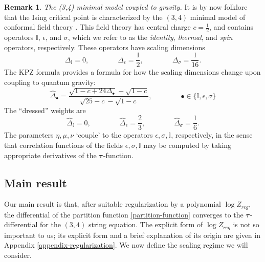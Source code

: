 \documentclass[usenames,dvipsnames]{article}
\theoremstyle{definition}
\newtheorem{remark}{Remark}[section]
\numberwithin{equation}{section}
\numberwithin{figure}{section}
\begin{document}
\begin{remark} \textit{The (3,4) minimal model coupled to gravity.}
It is by now folklore that the Ising critical point is characterized by the $(3,4)$ minimal model of conformal field theory \cite{DFMS}. This field theory has central charge $c=\frac{1}{2}$, and contains operators $\mathbb{I}$, $\epsilon$, and $\sigma$,
which we refer to as the \textit{identity}, \textit{thermal}, and \textit{spin} operators, respectively. These operators have scaling dimensions
    \begin{equation}
        \Delta_{\mathbb{I}} = 0, \qquad\qquad \Delta_{\epsilon} = \frac{1}{2},\qquad\qquad \Delta_{\sigma} =\frac{1}{16}.
    \end{equation}
The KPZ formula \cite{KPZ} provides a formula for how the scaling dimensions change upon coupling to quantum gravity:
    \begin{equation}
        \hat{\Delta}_{\bullet} = \frac{\sqrt{1-c+24\Delta_{\bullet}} -\sqrt{1-c}}{\sqrt{25-c} -\sqrt{1-c}},\qquad\qquad \bullet \in
        \{\mathbb{I},\epsilon, \sigma \}
    \end{equation}
The ``dressed'' weights are
    \begin{equation}
        \hat{\Delta}_{\mathbb{I}} = 0, \qquad\qquad \hat{\Delta}_{\epsilon} = \frac{2}{3},\qquad\qquad \hat{\Delta}_{\sigma} = \frac{1}{6}.
    \end{equation}
The parameters $\eta,\mu,\nu$ `couple' to the operators $\epsilon, \sigma, \mathbb{I}$, respectively, in the sense that correlation functions of the fields $\epsilon,\sigma,\mathbb{I}$ may be computed by taking appropriate derivatives of the $\boldsymbol{\tau}$-function.
\end{remark}

\subsection{Main result}
Our main result is that, after suitable regularization by a polynomial $\log Z_{reg}$, the differential of the partition function \eqref{partition-function} converges to the $\boldsymbol{\tau}$-differential for the $(3,4)$ string equation. The explicit form of $\log Z_{reg}$ is not so important to us; its explicit form and a brief explanation of its origin are given in Appendix \ref{appendix-regularization}. We now define the scaling regime we will consider.
\end{document}
